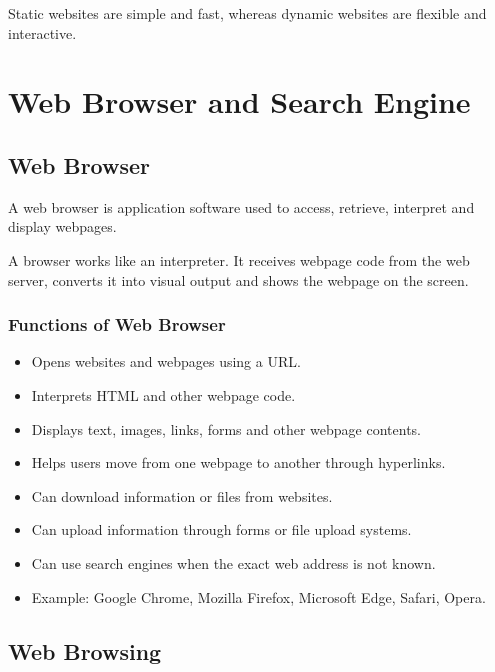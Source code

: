 \begin{summarybox}
Static websites are simple and fast, whereas dynamic websites are flexible and interactive.
\end{summarybox}

\section{Web Browser and Search Engine}

\subsection{Web Browser}

\begin{definitionbox}
A web browser is application software used to access, retrieve, interpret and display webpages.
\end{definitionbox}

A browser works like an interpreter. It receives webpage code from the web server, converts it into visual output and shows the webpage on the screen.

\subsubsection{Functions of Web Browser}

\begin{itemize}
    \item Opens websites and webpages using a URL.
    \item Interprets HTML and other webpage code.
    \item Displays text, images, links, forms and other webpage contents.
    \item Helps users move from one webpage to another through hyperlinks.
    \item Can download information or files from websites.
    \item Can upload information through forms or file upload systems.
    \item Can use search engines when the exact web address is not known.
    \item Example: Google Chrome, Mozilla Firefox, Microsoft Edge, Safari, Opera.
\end{itemize}

\subsection{Web Browsing}

